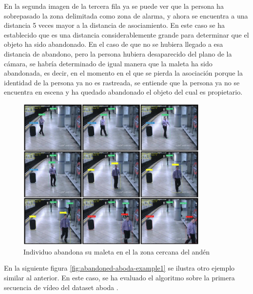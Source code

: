 En la segunda imagen de la tercera fila ya se puede ver que la persona ha sobrepasado la zona delimitada como zona de alarma, y ahora se encuentra a una distancia 5 veces mayor a la distancia de asociamiento. En este caso se ha establecido que es una distancia considerablemente grande para determinar que el objeto ha sido abandonado. En el caso de que no se hubiera llegado a esa distancia de abandono, pero la persona hubiera desaparecido del plano de la cámara, se habría determinado de igual manera que la maleta ha sido abandonada, es decir, en el momento en el que se pierda la asociación porque la identidad de la persona ya no es rastreada, se entiende que la persona ya no se encuentra en escena y ha quedado abandonado el objeto del cual es propietario.

\begin{figure}[ht]
\centering
\includegraphics[width=0.85\textwidth]{img/chapters/resultados/abandono/abandoned-avssab2007-example2.png}
\caption{\label{fig:abandoned-avssab2007-example2}Individuo abandona su maleta en el la zona cercana del andén \cite{AVSSAB2007-dataset}}
\end{figure}

En la siguiente figura \ref{fig:abandoned-aboda-example1} se ilustra otro ejemplo similar al anterior. En este caso, se ha evaluado el algoritmo sobre la primera secuencia de vídeo del dataset \gls{aboda} \cite{aboda-dataset}.

